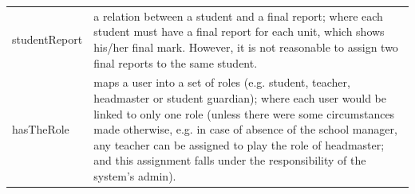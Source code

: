 \begin{table}[bth]
\begin{tabular}{p{0.9 in} p{5.9 in}}
studentReport &  a relation between a student and a final report; where each student must have a final report for each unit, which shows his/her final mark.  However, it is not reasonable to assign two final reports to the same student.\\

hasTheRole & maps a user into a set of roles (e.g. student, teacher, headmaster or student guardian); where each user would be linked to only one role (unless there were some circumstances made otherwise, e.g. in case of absence of the school manager, any teacher can be assigned to play the role of headmaster; and this assignment falls under the responsibility of the system’s admin).

\\ \hline\hline
\end{tabular}
\label{tab:namehere}
\end{table}








